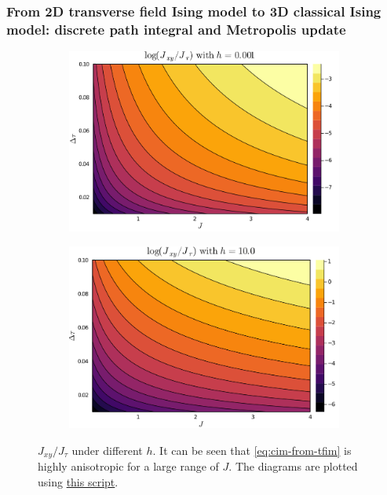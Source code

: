 \documentclass[hyperref, a4paper]{article}
\newcommand*{\tfim}{transverse field Ising model}
\newcommand*{\cim}{classical Ising model}
\begin{document}
\subsubsection{From 2D \tfim{} to 3D \cim: discrete path integral and Metropolis update}

\begin{figure}
    \centering
    \begin{subfigure}{0.48\textwidth}
        \includegraphics[width=\textwidth]{../analytical/jxy-jtau-ratio/ratio-h-0.001-dtau-0.02.PNG}
    \end{subfigure}
    \begin{subfigure}{0.48\textwidth}
        \includegraphics[width=\textwidth]{../analytical/jxy-jtau-ratio/ratio-h-10-dtau-0.02.PNG}
    \end{subfigure}
    \caption{$J_{xy} / J_\tau$ under different $h$. 
    It can be seen that \eqref{eq:cim-from-tfim} is highly anisotropic for a large range of $J$. The diagrams are plotted using \href{../analytical/jxy-jtau-ratio/2d-tfim-to-3d-cim-v2.jl}{this script}. }
    \label{fig:jxy-jtau-ratio}
\end{figure}
\end{document}
